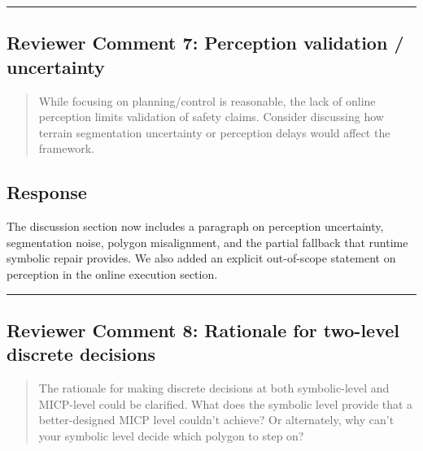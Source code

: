 \noindent\rule{17cm}{2.0pt}

\subsection{Reviewer Comment 7: Perception validation / uncertainty}
\begin{mdframed}
\begin{quote}
While focusing on planning/control is reasonable, the lack of online perception limits validation of safety claims. Consider discussing how terrain segmentation uncertainty or perception delays would affect the framework.
\end{quote}
\end{mdframed}

\subsection{Response}
The discussion section now includes a paragraph on perception uncertainty, segmentation noise, polygon misalignment, and the partial fallback that runtime symbolic repair provides. We also added an explicit out-of-scope statement on perception in the online execution section.

\noindent\rule{17cm}{2.0pt}

\subsection{Reviewer Comment 8: Rationale for two-level discrete decisions}
\begin{mdframed}
\begin{quote}
The rationale for making discrete decisions at both symbolic-level and MICP-level could be clarified. What does the symbolic level provide that a better-designed MICP level couldn't achieve? Or alternately, why can't your symbolic level decide which polygon to step on?
\end{quote}
\end{mdframed}

